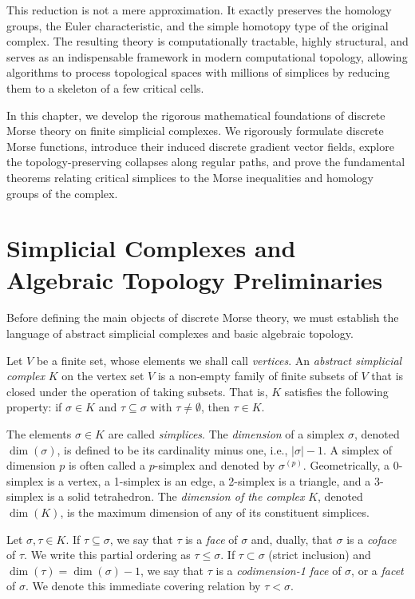 This reduction is not a mere approximation. It exactly preserves the homology groups, the Euler characteristic, and the simple homotopy type of the original complex. The resulting theory is computationally tractable, highly structural, and serves as an indispensable framework in modern computational topology, allowing algorithms to process topological spaces with millions of simplices by reducing them to a skeleton of a few critical cells.

In this chapter, we develop the rigorous mathematical foundations of discrete Morse theory on finite simplicial complexes. We rigorously formulate discrete Morse functions, introduce their induced discrete gradient vector fields, explore the topology-preserving collapses along regular paths, and prove the fundamental theorems relating critical simplices to the Morse inequalities and homology groups of the complex.

\section{Simplicial Complexes and Algebraic Topology Preliminaries}

Before defining the main objects of discrete Morse theory, we must establish the language of abstract simplicial complexes and basic algebraic topology.

Let $V$ be a finite set, whose elements we shall call \emph{vertices}. An \emph{abstract simplicial complex} $K$ on the vertex set $V$ is a non-empty family of finite subsets of $V$ that is closed under the operation of taking subsets. That is, $K$ satisfies the following property:
if $\sigma \in K$ and $\tau \subseteq \sigma$ with $\tau \neq \emptyset$, then $\tau \in K$. 

The elements $\sigma \in K$ are called \emph{simplices}. The \emph{dimension} of a simplex $\sigma$, denoted $\dim(\sigma)$, is defined to be its cardinality minus one, i.e., $|\sigma| - 1$. A simplex of dimension $p$ is often called a $p$-simplex and denoted by $\sigma^{(p)}$. Geometrically, a 0-simplex is a vertex, a 1-simplex is an edge, a 2-simplex is a triangle, and a 3-simplex is a solid tetrahedron. The \emph{dimension of the complex} $K$, denoted $\dim(K)$, is the maximum dimension of any of its constituent simplices. 

\begin{definition}
Let $\sigma, \tau \in K$. If $\tau \subseteq \sigma$, we say that $\tau$ is a \emph{face} of $\sigma$ and, dually, that $\sigma$ is a \emph{coface} of $\tau$. We write this partial ordering as $\tau \le \sigma$. If $\tau \subset \sigma$ (strict inclusion) and $\dim(\tau) = \dim(\sigma) - 1$, we say that $\tau$ is a \emph{codimension-1 face} of $\sigma$, or a \emph{facet} of $\sigma$. We denote this immediate covering relation by $\tau < \sigma$.
\end{definition}

